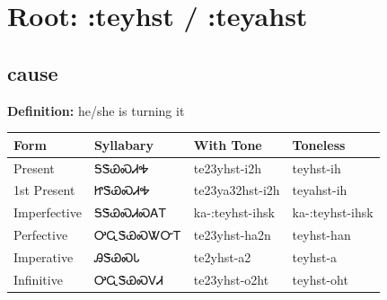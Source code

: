 \documentclass{article}%
\begin{document}
%
\normalsize%
\section*{Root: :teyhst / :teyahst}%
\subsection*{cause}%
\textbf{Definition: }%
he/she is turning it%
\\[0.5em]%
\begin{tabular}{|l|l|l|l|}%
\hline%
\textbf{Form}&\textbf{Syllabary}&\textbf{With Tone}&\textbf{Toneless}\\%
\hline%
Present&ᎦᏕᏯᏍᏗᎭ&te23yhst{-}i2h&teyhst{-}ih\\%
1st Present&ᏥᏕᏯᏍᏗᎭ&te23ya32hst{-}i2h&teyahst{-}ih\\%
Imperfective&ᎦᏕᏯᏍᏗᏍᎪᎢ&ka{-}:teyhst{-}ihsk&ka{-}:teyhst{-}ihsk\\%
Perfective&ᎤᏩᏕᏯᏍᏔᏅᎢ&te23yhst{-}ha2n&teyhst{-}han\\%
Imperative&ᎯᏕᏯᏍᏓ&te2yhst{-}a2&teyhst{-}a\\%
Infinitive&ᎤᏩᏕᏯᏍᏙᏗ&te23yhst{-}o2ht&teyhst{-}oht\\%
\hline%
\end{tabular}%
\\[1em]%
\end{document}
